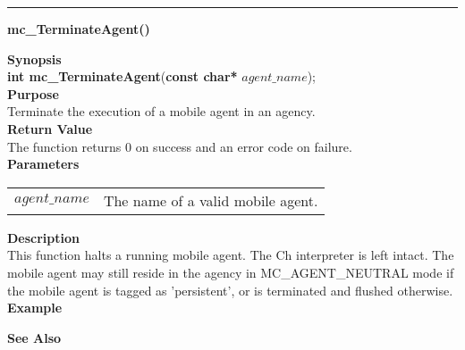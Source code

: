 \noindent
\vspace{5pt}
\rule{6.5in}{0.015in}
\noindent
{\LARGE \bf mc\_TerminateAgent()}\\
{}
\label{api:mc_TerminateAgent()}

\noindent
{\bf Synopsis}\\
{\bf int mc\_TerminateAgent}({\bf const char*} $agent\_name$);\\

\noindent
{\bf Purpose}\\
Terminate the execution of a mobile agent in an agency.\\

\noindent
{\bf Return Value}\\
The function returns 0 on success and an error code on failure.\\

\noindent
{\bf Parameters}
\vspace{-0.1in}
\begin{description}
\item
\begin{tabular}{p{20 mm}p{145 mm}}
$agent\_name$ & The name of a valid mobile agent.
\end{tabular}
\end{description}

\noindent
{\bf Description}\\
This function halts a running mobile agent. 
The Ch interpreter is left intact. 
The mobile agent may still reside in the agency in MC\_AGENT\_NEUTRAL mode if 
the mobile agent is tagged as 'persistent', or is terminated and flushed 
otherwise.\\

\noindent
{\bf Example}\\
\noindent
{\footnotesize}

\noindent
{\bf See Also}\\

